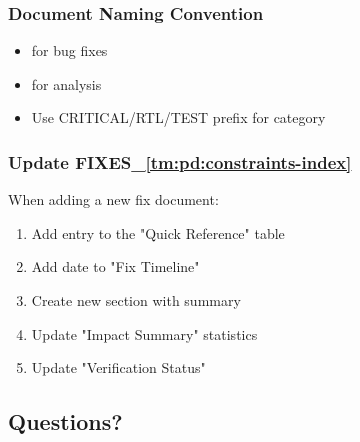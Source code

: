\subsubsection{Document Naming Convention}\label{cr:fix:fixes-readme:document-naming-convention}

\begin{record}

\begin{itemize}
\tightlist
\item
   for bug fixes
\item
   for analysis
\item
  Use CRITICAL/\allowbreak{}RTL/\allowbreak{}TEST prefix for category
\end{itemize}

\end{record}

\subsubsection{\texorpdfstring{Update
FIXES\_\allowbreak{}\cref{tm:pd:constraints-index}}{Update \cref{cr:fix:fixes-index}}}\label{cr:fix:fixes-readme:update-fixes-indexmd}

\begin{record}

When adding a new fix document:

\begin{enumerate}
\def\labelenumi{\arabic{enumi}.}
\tightlist
\item
  Add entry to the "Quick Reference" table
\item
  Add date to "Fix Timeline"
\item
  Create new section with summary
\item
  Update "Impact Summary" statistics
\item
  Update "Verification Status"
\end{enumerate}

\end{record}

\subsection{Questions?}\label{cr:fix:fixes-readme:questions}

